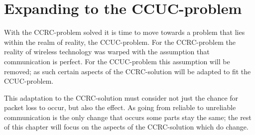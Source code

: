\chapter{Expanding to the CCUC-problem}\label{CCUC}
With the CCRC-problem solved it is time to move towards a problem that lies within the realm of reality, the CCUC-problem.
For the CCRC-problem the reality of wireless technology was warped with the assumption that communication is perfect.
For the CCUC-problem this assumption will be removed; as such certain aspects of the CCRC-solution will be adapted to fit the CCUC-problem.

This adaptation to the CCRC-solution must consider not just the chance for packet loss to occur, but also the effect.
As going from reliable to unreliable communication is the only change that occurs some parts stay the same; the rest of this chapter will focus on the aspects of the CCRC-solution which do change.







